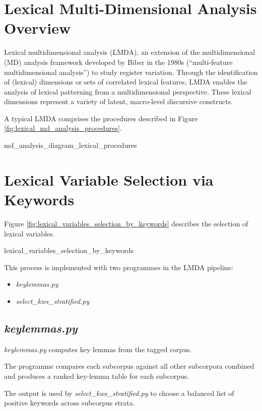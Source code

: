 \section{Lexical Multi-Dimensional Analysis Overview}

Lexical multidimensional analysis (LMDA), an extension of the multidimensional (MD) analysis framework developed by Biber in the 1980s (``multi-feature multidimensional analysis'') to study register variation. Through the identification of (lexical) dimensions or sets of correlated lexical features, LMDA enables the analysis of lexical patterning from a multidimensional perspective. These lexical dimensions represent a variety of latent, macro-level discursive constructs. \parencite[p.1]{berbersardinhaLexicalMultiDimensionalAnalysis2025}

A typical LMDA comprises the procedures described in Figure \ref{fig:lexical_md_analysis_procedures}.

{md_analysis_diagram_lexical_procedures}

\section{Lexical Variable Selection via Keywords}

Figure \ref{fig:lexical_variables_selection_by_keywords} describes the selection of lexical variables.

{lexical_variables_selection_by_keywords}

This process is implemented with two programmes in the LMDA pipeline:

\begin{itemize}
    \item \textit{keylemmas.py}
    \item \textit{select\_kws\_stratified.py}
\end{itemize}

\subsection{\textit{keylemmas.py}}

\textit{keylemmas.py} computes key lemmas from the tagged corpus.

The programme compares each subcorpus against all other subcorpora combined and produces a ranked key-lemma table for each subcorpus.

The output is used by \textit{select\_kws\_stratified.py} to choose a balanced list of positive keywords across subcorpus strata.

